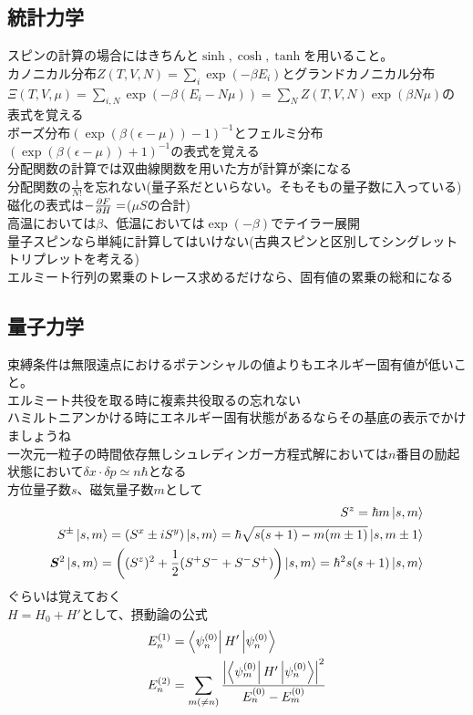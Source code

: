 \documentclass{ltjsarticle}
\begin{document}
  \subsection{統計力学}
  スピンの計算の場合にはきちんと$\sinh,\cosh,\tanh$を用いること。\\
  カノニカル分布$Z(T,V,N)=\sum_i \exp(-\beta E_i)$とグランドカノニカル分布$\Xi(T,V,\mu)=\sum_{i,N}\exp(-\beta(E_i-N\mu))=\sum_N Z(T,V,N)\exp(\beta N\mu)$の表式を覚える\\
  ボーズ分布$(\exp(\beta(\epsilon-\mu))-1)^{-1}$とフェルミ分布$(\exp(\beta(\epsilon-\mu))+1)^{-1}$の表式を覚える\\
  分配関数の計算では双曲線関数を用いた方が計算が楽になる\\
  分配関数の$\frac{1}{N!}$を忘れない(量子系だといらない。そもそもの量子数に入っている)\\
  磁化の表式は$-\pdv{F}{H}=$($\mu S$の合計)\\
  高温においては$\beta$、低温においては$\exp(-\beta)$でテイラー展開\\
  量子スピンなら単純に計算してはいけない(古典スピンと区別してシングレットトリプレットを考える)\\
  エルミート行列の累乗のトレース求めるだけなら、固有値の累乗の総和になる

  \subsection{量子力学}
  束縛条件は無限遠点におけるポテンシャルの値よりもエネルギー固有値が低いこと。\\
  エルミート共役を取る時に複素共役取るの忘れない\\
  ハミルトニアンかける時にエネルギー固有状態があるならその基底の表示でかけましょうね\\
  一次元一粒子の時間依存無しシュレディンガー方程式解においては$n$番目の励起状態において$\delta x\cdot \delta p\simeq n\hbar$となる\\
  方位量子数$s$、磁気量子数$m$として
  \begin{align}
    S^z=\hbar m\ket{s,m}\\
    S^\pm\ket{s,m}=(S^x\pm iS^y)\ket{s,m}=\hbar\sqrt{s(s+1)-m(m\pm 1)}\ket{s,m\pm 1}\\
    \bm{S}^2\ket{s,m}=\left((S^z)^2+\frac{1}{2}(S^+S^-+S^-S^+)\right)\ket{s,m}=\hbar^2s(s+1)\ket{s,m}\\
  \end{align}
  ぐらいは覚えておく\\
  $H=H_0+H'$として、摂動論の公式
  \begin{align}
    E_n^{(1)}&=\bra{\psi_n^{(0)}}H' \ket{\psi_n^{(0)}}\\
    E_n^{(2)}&=\sum_{m(\neq n)}\frac{\abs{\bra{\psi_m^{(0)}}H' \ket{\psi_n^{(0)}}}^2}{E_n^{(0)}-E_m^{(0)}}
  \end{align}
\end{document}
